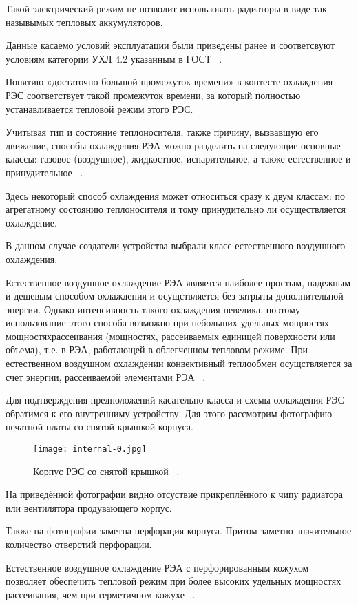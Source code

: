 Такой электрический режим не позволит использовать радиаторы в виде
так назывымых тепловых аккумуляторов.

Данные касаемо условий эксплуатации были приведены ранее и
соответсвуют условиям категории УХЛ 4.2 указанным в ГОСТ
~\cite{GOST-15150-69}.

Понятию «достаточно большой промежуток времени» в контесте охлаждения
РЭС соответствует такой промежуток времени, за который полностью
устанавливается тепловой режим этого РЭС.

Учитывая тип и состояние теплоносителя, также причину, вызвавшую его
движение, способы охлаждения РЭА можно разделить на следующие основные
классы: газовое (воздушное), жидкостное, испарительное, а также
естественное и принудительное ~\cite{Rotkop1976}.

Здесь некоторый способ охлаждения может относиться сразу к двум
классам: по агрегатному состоянию теплоносителя и тому принудительно
ли осуществляется охлаждение.

В данном случае создатели устройства выбрали класс естественного
воздушного охлаждения.

Естественное воздушное охлаждение РЭА является наиболее простым,
надежным и дешевым способом охлаждения и осущствляется без затрыты
дополнительной энергии. Однако интенсивность такого охлаждения
невелика, поэтому использование этого способа возможно при небольших
удельных мощностях мощностяхрассеивания (мощностях, рассеиваемых
единицей поверхности или объема), т.е. в РЭА, работающей в облегченном
тепловом режиме. При естественном воздушном охлаждении конвективный
теплообмен осущствляется за счет энергии, рассеиваемой элементами РЭА ~\cite{Rotkop1976}.

Для подтверждения предположений касательно класса и схемы охлаждения
РЭС обратимся к его внутренниму устройству. Для этого рассмотрим
фотографию печатной платы со снятой крышкой корпуса.

\begin{figure}[h]
  \centering
  \texttt{[image: internal-0.jpg]}
  \caption{Корпус РЭС со снятой крышкой ~\cite{INTERNAL-PHOTOS}.}
\end{figure}

На приведённой фотографии видно отсуствие прикреплённого к чипу
радиатора или вентилятора продувающего корпус.

Также на фотографии заметна перфорация корпуса. Притом заметно
значительное количество отверстий перфорации.

Естественное воздушное охлаждение РЭА с перфорированным кожухом
позволяет обеспечить тепловой режим при более высоких удельных
мощностях рассеивания, чем при герметичном кожухе ~\cite{Rotkop1976}.


